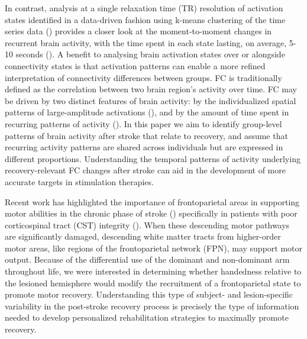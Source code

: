 \documentclass[phd,tocprelim]{cornell}
\begin{document}
	In contrast, analysis at a single relaxation time (TR) resolution of activation states identified in a data-driven fashion using k-means clustering of the time series data (\cite{Cornblath2020-nc}) provides a closer look at the moment-to-moment changes in recurrent brain activity, with the time spent in each state lasting, on average, 5-10 seconds (\cite{Cornblath2020-nc}). A benefit to analysing brain activation states over or alongside connectivity states is that activation patterns can enable a more refined interpretation of connectivity differences between groups. FC is traditionally defined as the correlation between two brain region's activity over time. FC may be driven by two distinct features of brain activity: by the individualized spatial patterns of large-amplitude activations (\cite{Zamani_Esfahlani2020-dn}), and by the amount of time spent in recurring patterns of activity (\cite{Betzel2021-ve, Baker2014-zt}). In this paper we aim to identify group-level patterns of brain activity after stroke that relate to recovery, and assume that recurring activity patterns are shared across individuals but are expressed in different proportions.   Understanding the temporal patterns of activity underlying recovery-relevant FC changes after stroke can aid in the development of more accurate targets in stimulation therapies.
	
     Recent work has highlighted the importance of frontoparietal areas in supporting motor abilities in the chronic phase of stroke (\cite{Tscherpel2020-oi, Hensel2022-sl}) specifically in patients with poor corticospinal tract (CST) integrity (\cite{Hordacre2021-ct}). When these descending motor pathways are significantly damaged, descending white matter tracts from higher-order motor areas, like regions of the frontoparietal network (FPN), may support motor output. Because of the differential use of the dominant and non-dominant arm throughout life, we were interested in determining whether handedness relative to the lesioned hemisphere would modify the recruitment of a frontoparietal state to promote motor recovery. Understanding this type of subject- and lesion-specific variability in the post-stroke recovery process is precisely the type of information needed to develop personalized rehabilitation strategies to maximally promote recovery.
  
\end{document}
